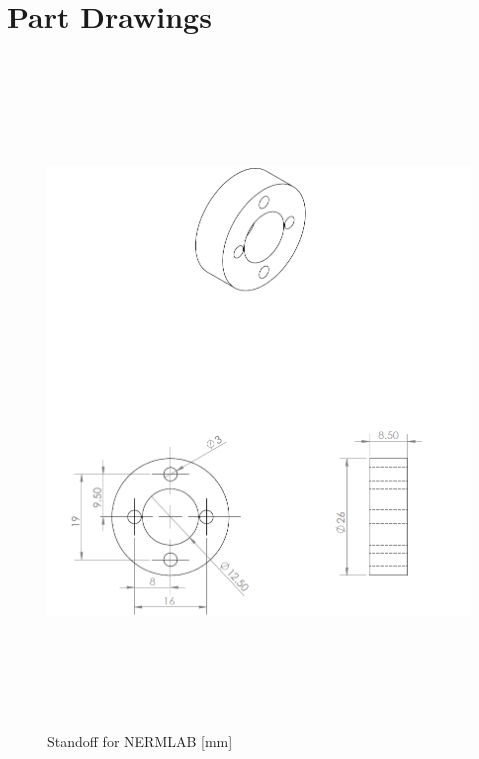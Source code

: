 
\cleardoublepage

\chapter{Part Drawings}
\label{Appendix:Key2}

\begin{figure}[htb]%
	\begin{center}
		\includegraphics[height=7in]{figures/drawings/standoff_drawing.png}
		
		\caption[Standoff for NERMLAB]{Standoff for NERMLAB [mm]}
		
		\label{standoff_drawing}
	\end{center}
\end{figure}

